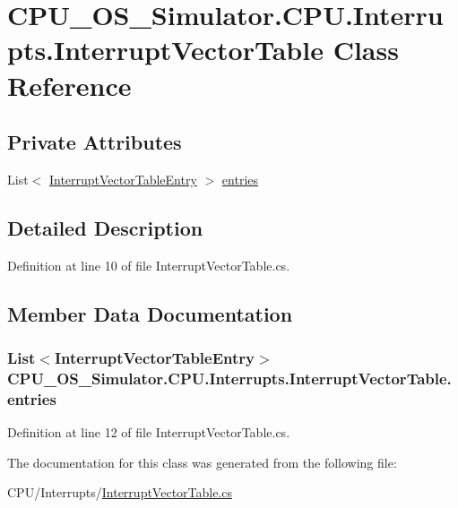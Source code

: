 \hypertarget{class_c_p_u___o_s___simulator_1_1_c_p_u_1_1_interrupts_1_1_interrupt_vector_table}{}\section{C\+P\+U\+\_\+\+O\+S\+\_\+\+Simulator.\+C\+P\+U.\+Interrupts.\+Interrupt\+Vector\+Table Class Reference}
\label{class_c_p_u___o_s___simulator_1_1_c_p_u_1_1_interrupts_1_1_interrupt_vector_table}
\subsection*{Private Attributes}
\begin{DoxyCompactItemize}
\item 
List$<$ \hyperlink{class_c_p_u___o_s___simulator_1_1_c_p_u_1_1_interrupts_1_1_interrupt_vector_table_entry}{Interrupt\+Vector\+Table\+Entry} $>$ \hyperlink{class_c_p_u___o_s___simulator_1_1_c_p_u_1_1_interrupts_1_1_interrupt_vector_table_a93f12ba4395d9759c9971f7741ec4d15}{entries}
\end{DoxyCompactItemize}


\subsection{Detailed Description}


Definition at line 10 of file Interrupt\+Vector\+Table.\+cs.



\subsection{Member Data Documentation}
\hypertarget{class_c_p_u___o_s___simulator_1_1_c_p_u_1_1_interrupts_1_1_interrupt_vector_table_a93f12ba4395d9759c9971f7741ec4d15}{}
\subsubsection[{entries}]{\setlength{\rightskip}{0pt plus 5cm}List$<${\bf Interrupt\+Vector\+Table\+Entry}$>$ C\+P\+U\+\_\+\+O\+S\+\_\+\+Simulator.\+C\+P\+U.\+Interrupts.\+Interrupt\+Vector\+Table.\+entries\hspace{0.3cm}{\ttfamily [private]}}\label{class_c_p_u___o_s___simulator_1_1_c_p_u_1_1_interrupts_1_1_interrupt_vector_table_a93f12ba4395d9759c9971f7741ec4d15}


Definition at line 12 of file Interrupt\+Vector\+Table.\+cs.



The documentation for this class was generated from the following file\+:\begin{DoxyCompactItemize}
\item 
C\+P\+U/\+Interrupts/\hyperlink{_interrupt_vector_table_8cs}{Interrupt\+Vector\+Table.\+cs}\end{DoxyCompactItemize}

